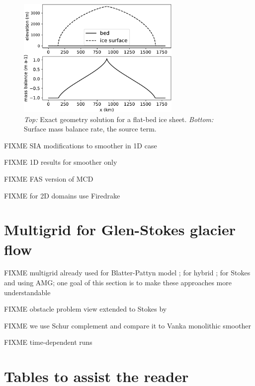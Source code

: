 \documentclass[letterpaper,final,12pt,reqno]{amsart}
\theoremstyle{claim}
\numberwithin{equation}{section}
\numberwithin{figure}{section}
\numberwithin{table}{section}
\numberwithin{theorem}{section}
\begin{document}
\begin{figure}
\includegraphics[width=0.7\textwidth]{fixfigs/siadatafigure.pdf}
\caption{\emph{Top:} Exact geometry solution for a flat-bed ice sheet.  \emph{Bottom:} Surface mass balance rate, the source term.}
\label{fig:siadatafigure}
\end{figure}

FIXME SIA modifications to smoother in 1D case

FIXME 1D results for smoother only

FIXME FAS version of MCD

FIXME for 2D domains use Firedrake


\section{Multigrid for Glen-Stokes glacier flow} \label{sec:stokes}

FIXME multigrid already used for Blatter-Pattyn model \cite{BrownSmithAhmadia2013}; for hybrid \cite{Jouvetetal2013,JouvetGraeser2013}; for Stokes \cite{IsaacStadlerGhattas2015} and \cite{Tuminaroetal2016} using AMG; one goal of this section is to make these approaches more understandable

FIXME obstacle problem view extended to Stokes by \cite{WirbelJarosch2020}

FIXME we use Schur complement \cite{Bueler2021,Elmanetal2014} and compare it to Vanka monolithic smoother \cite{Farrelletal2019}

FIXME time-dependent runs


\small

\bigskip



\normalsize

\appendix

\section{Tables to assist the reader}
\end{document}
